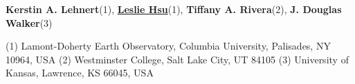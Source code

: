\textbf{Kerstin A. Lehnert}(1), \href{https://www.authorea.com/users/7580}{\textbf{Leslie Hsu}}(1), \textbf{Tiffany A. Rivera}(2), \textbf{J. Douglas Walker}(3)

(1) Lamont-Doherty Earth Observatory, Columbia University, Palisades, NY 10964, USA
(2) Westminster College, Salt Lake City, UT 84105
(3) University of Kansas, Lawrence, KS 66045, USA
